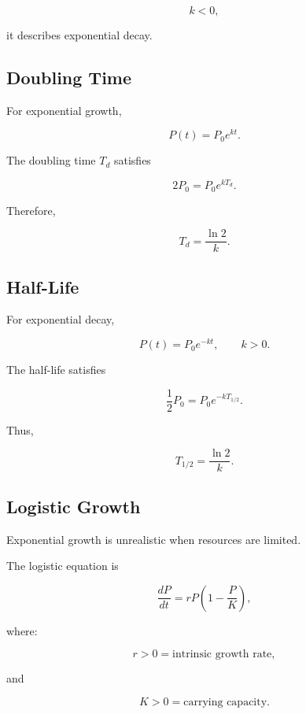 \[
\boxed{
k<0,
}
\]

it describes exponential decay.

\subsection{Doubling Time}
\label{subsec:doubling-time}

For exponential growth,

\[
P(t)=P_0e^{kt}.
\]

The doubling time \(T_d\) satisfies

\[
2P_0
=
P_0e^{kT_d}.
\]

Therefore,

\[
\boxed{
T_d
=
\frac{
\ln2
}{
k
}.
}
\]

\subsection{Half-Life}
\label{subsec:half-life}

For exponential decay,

\[
P(t)=P_0e^{-kt},
\qquad
k>0.
\]

The half-life satisfies

\[
\frac12P_0
=
P_0e^{-kT_{1/2}}.
\]

Thus,

\[
\boxed{
T_{1/2}
=
\frac{
\ln2
}{
k
}.
}
\]

\subsection{Logistic Growth}
\label{subsec:logistic-growth-ode}

Exponential growth is unrealistic when resources are limited.

The logistic equation is

\[
\boxed{
\frac{dP}{dt}
=
rP
\left(
1-\frac{P}{K}
\right),
}
\]

where:

\[
r>0
=
\text{intrinsic growth rate},
\]

and

\[
K>0
=
\text{carrying capacity}.
\]

